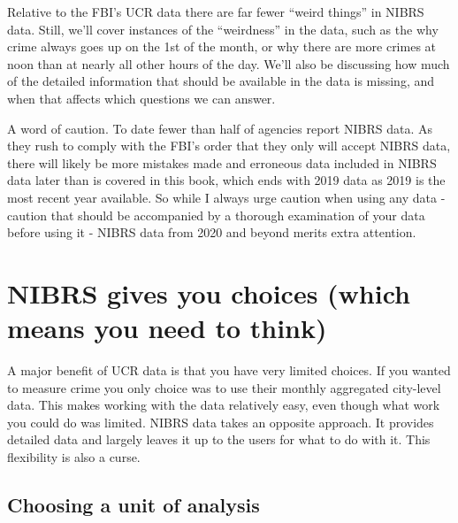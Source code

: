\documentclass[
  12pt,
  openany]{book}
\begin{document}
Relative to the FBI's UCR data there are far fewer ``weird things'' in NIBRS data. Still, we'll cover instances of the ``weirdness'' in the data, such as the why crime always goes up on the 1st of the month, or why there are more crimes at noon than at nearly all other hours of the day. We'll also be discussing how much of the detailed information that should be available in the data is missing, and when that affects which questions we can answer.

A word of caution. To date fewer than half of agencies report NIBRS data. As they rush to comply with the FBI's order that they only will accept NIBRS data, there will likely be more mistakes made and erroneous data included in NIBRS data later than is covered in this book, which ends with 2019 data as 2019 is the most recent year available. So while I always urge caution when using any data - caution that should be accompanied by a thorough examination of your data before using it - NIBRS data from 2020 and beyond merits extra attention.

\hypertarget{nibrs-gives-you-choices-which-means-you-need-to-think}{%
\section{NIBRS gives you choices (which means you need to think)}\label{nibrs-gives-you-choices-which-means-you-need-to-think}}

A major benefit of UCR data is that you have very limited choices. If you wanted to measure crime you only choice was to use their monthly aggregated city-level data. This makes working with the data relatively easy, even though what work you could do was limited. NIBRS data takes an opposite approach. It provides detailed data and largely leaves it up to the users for what to do with it. This flexibility is also a curse.

\hypertarget{choosing-a-unit-of-analysis}{%
\subsection{Choosing a unit of analysis}\label{choosing-a-unit-of-analysis}}
\end{document}
